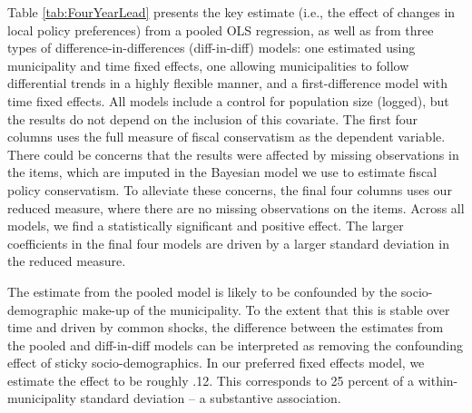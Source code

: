\documentclass[a4paper,12pt]{article}
\begin{document}
Table \ref{tab:FourYearLead} presents the key estimate (i.e., the effect of changes in local policy preferences) from a pooled OLS regression, as well as from three types of difference-in-differences (diff-in-diff) models: one estimated using municipality and time fixed effects, one allowing municipalities to follow differential trends in a highly flexible manner, and a first-difference model with time fixed effects. All models include a control for population size (logged), but the results do not depend on the inclusion of this covariate.  The  first four columns uses the full measure of fiscal conservatism as the dependent variable. There could be concerns that the results were affected by missing observations in the items, which are imputed in the Bayesian model we use to estimate fiscal policy conservatism. To alleviate these concerns, the final four columns uses our reduced measure, where there are no missing observations on the items. Across all models, we find a statistically significant and positive effect. The larger coefficients in the final four models are driven by a larger standard deviation in the reduced measure.

The estimate from the pooled model is likely to be confounded by the socio-demographic make-up of the municipality. To the extent that this is stable over time and driven by common shocks, the difference between the estimates from the pooled and diff-in-diff models can be interpreted as removing the confounding effect of sticky socio-demographics. In our preferred fixed effects model, we estimate the effect to be roughly .12. This corresponds to 25 percent of a within-municipality standard deviation -- a substantive association. 
\end{document}
